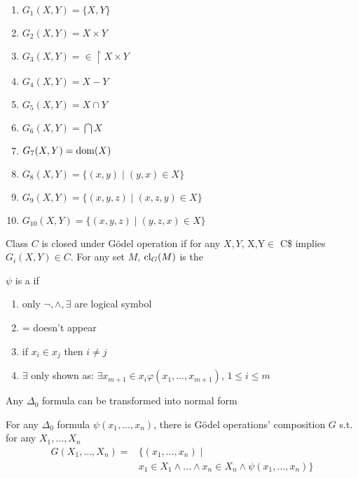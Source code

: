 \documentclass[11pt]{article}
\begin{document}
\begin{definition}[]
\begin{enumerate}
\item \(G_1(X,Y)=\{X,Y\}\)
\item \(G_2(X,Y)=X\times Y\)
\item \(G_3(X,Y)=\in\restriction X\times Y\)
\item \(G_4(X,Y)=X-Y\)
\item \(G_5(X,Y)=X\cap Y\)
\item \(G_6(X,Y)=\bigcap X\)
\item \(G_7(X,Y)=\mathrm{dom}{(X)}\)
\item \(G_8(X,Y)=\{(x,y)\mid(y,x)\in X\}\)
\item \(G_9(X,Y)=\{(x,y,z)\mid(x,z,y)\in X\}\)
\item \(G_{10}(X,Y)=\{(x,y,z)\mid(y,z,x)\in X\}\)
\end{enumerate}


Class \(C\) is closed under Gödel operation if for any \(X,Y\), X,Y\(\in\) C\$ implies
\(G_i(X,Y)\in C\). For any set \(M\), \(\text{cl}_G(M)\) is the 
\end{definition}

\begin{definition}[]
\(\psi\) is a  if
\begin{enumerate}
\item only \(\neg,\wedge,\exists\) are logical symbol
\item = doesn't appear
\item if \(x_i\in x_j\) then \(i\neq j\)
\item \(\exists\) only shown as: \(\exists x_{m+1}\in
      x_i\varphi(x_1,\dots,x_{m+1})\), \(1\le i\le m\)
\end{enumerate}
\end{definition}

\begin{lemma}[]
Any \(\Delta_0\) formula can be transformed into normal form
\end{lemma}

\begin{theorem}[]
For any \(\Delta_0\) formula \(\psi(x_1,\dots,x_n)\), there is Gödel operations'
composition \(G\) s.t. for any \(X_1,\dots,X_n\)
\begin{align*}
G(X_1,\dots,X_n)=&\{(x_1,\dots,x_n)\mid\\
&x_1\in X_1\wedge\dots\wedge x_n\in X_n\wedge\psi(x_1,\dots,x_n)\}
\end{align*}
\end{theorem}
\end{document}
